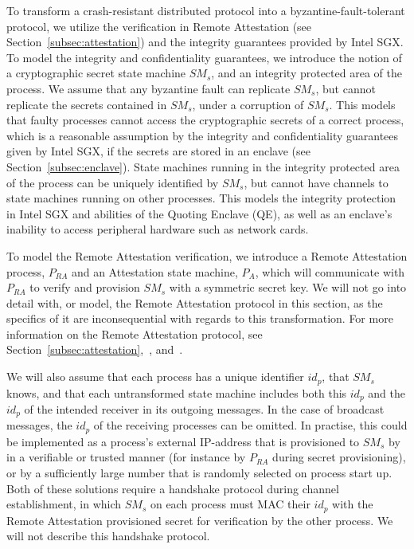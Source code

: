 \documentclass{article}
\begin{document}
	To transform a crash-resistant distributed protocol into a byzantine-fault-tolerant protocol, we utilize the verification in Remote Attestation (see Section~\ref{subsec:attestation}) and the integrity guarantees provided by Intel SGX.
	To model the integrity and confidentiality guarantees, we introduce the notion of a cryptographic secret state machine $SM_{s}$, and an integrity protected area of the process.
	We assume that any byzantine fault can replicate $SM_{s}$, but cannot replicate the secrets contained in $SM_s$, under a corruption of $SM_s$.
	This models that faulty processes cannot access the cryptographic secrets of a correct process, which is a reasonable assumption by the integrity and confidentiality guarantees given by Intel SGX, if the secrets are stored in an enclave (see Section~\ref{subsec:enclave}).
	State machines running in the integrity protected area of the process can be uniquely identified by $SM_{s}$, but cannot have channels to state machines running on other processes.
	This models the integrity protection in Intel SGX and abilities of the Quoting Enclave (QE), as well as an enclave's inability to access peripheral hardware such as network cards.

	To model the Remote Attestation verification, we introduce a Remote Attestation process, $P_{RA}$ and an Attestation state machine, $P_A$, which will communicate with $P_{RA}$ to verify and provision $SM_s$ with a symmetric secret key.
	We will not go into detail with, or model, the Remote Attestation protocol in this section, as the specifics of it are inconsequential with regards to this transformation.
	For more information on the Remote Attestation protocol, see Section~\ref{subsec:attestation},~\cite{costan_intel_2016}, and~\cite{intel_sgx_developer_reference}.

	We will also assume that each process has a unique identifier $id_p$, that $SM_s$ knows, and that each untransformed state machine includes both this $id_p$ and the $id_p$ of the intended receiver in its outgoing messages.
	In the case of broadcast messages, the $id_p$ of the receiving processes can be omitted.
	In practise, this could be implemented as a process's external IP-address that is provisioned to $SM_s$ by in a verifiable or trusted manner (for instance by $P_{RA}$ during secret provisioning), or by a sufficiently large number that is randomly selected on process start up.
	Both of these solutions require a handshake protocol during channel establishment, in which $SM_s$ on each process must MAC their $id_p$ with the Remote Attestation provisioned secret for verification by the other process.
	We will not describe this handshake protocol.
\end{document}
